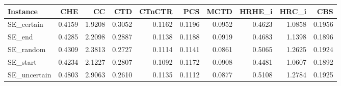 \begin{tabular}{lrrrrrrrrr}
\toprule
Instance & CHE & CC & CTD & CTnCTR & PCS & MCTD & HRHE_i & HRC_i & CBS \\
\midrule
SE_certain & 0.4159 & 1.9208 & 0.3052 & 0.1162 & 0.1196 & 0.0952 & 0.4623 & 1.0858 & 0.1956 \\
SE_end & 0.4285 & 2.2098 & 0.2887 & 0.1138 & 0.1188 & 0.0919 & 0.4683 & 1.1398 & 0.1896 \\
SE_random & 0.4309 & 2.3813 & 0.2727 & 0.1114 & 0.1141 & 0.0861 & 0.5065 & 1.2625 & 0.1924 \\
SE_start & 0.4234 & 2.1227 & 0.2807 & 0.1092 & 0.1172 & 0.0908 & 0.4481 & 1.0607 & 0.1892 \\
SE_uncertain & 0.4803 & 2.9063 & 0.2610 & 0.1135 & 0.1112 & 0.0877 & 0.5108 & 1.2784 & 0.1925 \\
\bottomrule
\end{tabular}
